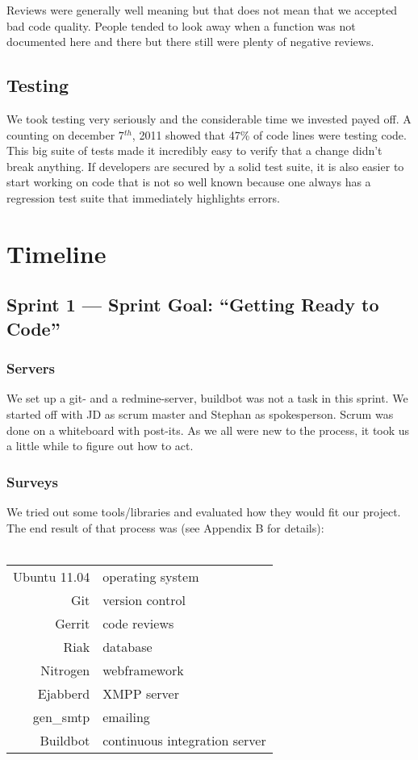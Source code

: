 \documentclass[11pt,a4paper]{report}
\begin{document}
Reviews were generally well meaning but that does not mean that we accepted bad
code quality. People tended to look away when a function was not documented here
and there but there still were plenty of negative reviews.

\subsection*{Testing}
We took testing very seriously and the considerable time we invested payed off.
A counting on december 7$^{th}$, 2011 showed that 47\% of code lines were testing
code. This big suite of tests made it incredibly easy to verify that a change 
didn't break anything. If developers are secured by a solid test suite, it is
also easier to start working on code that is not so well known because one 
always has a regression test suite that immediately highlights errors.

\section{Timeline}
\subsection*{Sprint 1 --- Sprint Goal: ``Getting Ready to Code''}
\subsubsection{Servers}
We set up a git- and a redmine-server, buildbot was not
a task in this sprint. We started off with JD as scrum master and Stephan as
spokesperson. Scrum was done on a whiteboard with post-its.
As we all were new to the process, it took us a little while to figure out how
to act.
\subsubsection{Surveys}
We tried out some tools/libraries and evaluated how they would fit
our project. The end result of that process was (see Appendix B for details): \\
\\
\begin{tabular}{r|l}
Ubuntu 11.04 & operating system \\
Git          & version control  \\
Gerrit       & code reviews     \\
Riak         & database         \\
Nitrogen     & webframework     \\
Ejabberd     & XMPP server      \\
gen\_smtp    & emailing         \\
Buildbot     & continuous integration server
\end{tabular}
\end{document}
